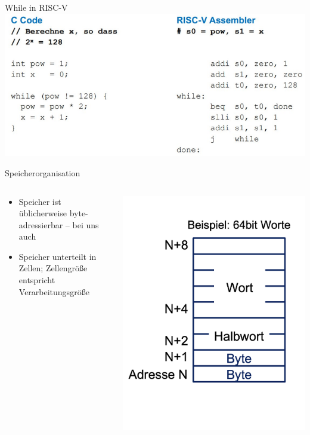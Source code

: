 \documentclass[
  german,            %
  aspectratio=169,    %
]{tumbeamer}
\begin{document}
\begin{frame}[c]{While in RISC-V}{}
  \centering
  \includegraphics[width=0.8\linewidth]{w03_whileassembly.png}
\end{frame}

\begin{frame}[c]{Speicherorganisation}{}
  \begin{columns}[c]
    \begin{column}{0.5\textwidth}
      \begin{itemize}
          \item Speicher ist üblicherweise byte-adressierbar -- bei uns auch
          \item Speicher unterteilt in Zellen; Zellengröße entspricht Verarbeitungsgröße
      \end{itemize}
    \end{column}
    \begin{column}{0.5\textwidth}
      \includegraphics[width=0.70\linewidth]{speicher.png}
    \end{column}
  \end{columns}
\end{frame}
\end{document}
